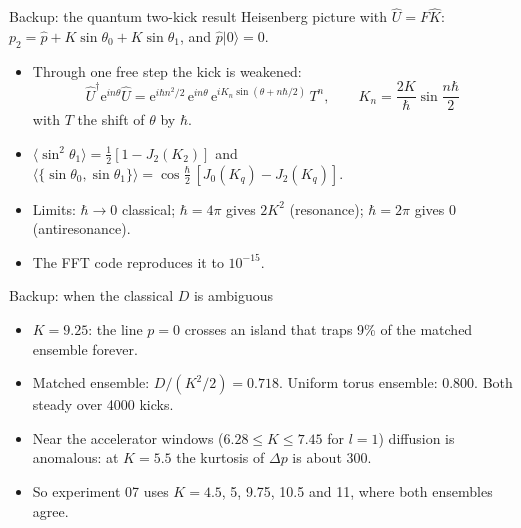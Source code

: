 \documentclass[aspectratio=169,10pt]{beamer}
\newcommand{\avg}[1]{\langle #1 \rangle}
\newcommand{\ee}{\mathrm{e}}
\begin{document}
\begin{frame}{Backup: the quantum two-kick result}
  \small
  Heisenberg picture with $\hat U = F\hat K$: $p_2 = \hat p + K\sin\theta_0 + K\sin\theta_1$, and $\hat p|0\rangle = 0$.
  \begin{itemize}
    \item Through one free step the kick is weakened:
    \[
      \hat U^\dagger\ee^{in\theta}\hat U = \ee^{i\hbar n^2/2}\,\ee^{in\theta}\,\ee^{iK_n\sin(\theta + n\hbar/2)}\,T^n,
      \qquad K_n = \frac{2K}{\hbar}\sin\frac{n\hbar}{2}
    \]
    with $T$ the shift of $\theta$ by $\hbar$.
    \item $\avg{\sin^2\theta_1} = \frac12[1 - J_2(K_2)]$ and
    $\avg{\{\sin\theta_0,\sin\theta_1\}} = \cos\frac{\hbar}{2}\,[J_0(K_q) - J_2(K_q)]$.
    \item Limits: $\hbar\to0$ classical; $\hbar = 4\pi$ gives $2K^2$ (resonance); $\hbar = 2\pi$ gives 0
    (antiresonance).
    \item The FFT code reproduces it to $10^{-15}$.
  \end{itemize}
\end{frame}

\begin{frame}{Backup: when the classical \texorpdfstring{$D$}{D} is ambiguous}
  \begin{itemize}
    \item $K = 9.25$: the line $p = 0$ crosses an island that traps 9\% of the matched ensemble forever.
    \item Matched ensemble: $D/(K^2/2) = 0.718$. Uniform torus ensemble: $0.800$. Both steady over 4000 kicks.
    \item Near the accelerator windows ($6.28 \le K \le 7.45$ for $l = 1$) diffusion is anomalous: at
    $K = 5.5$ the kurtosis of $\Delta p$ is about 300.
    \item So experiment 07 uses $K = 4.5$, 5, 9.75, 10.5 and 11, where both ensembles agree.
  \end{itemize}
\end{frame}
\end{document}
